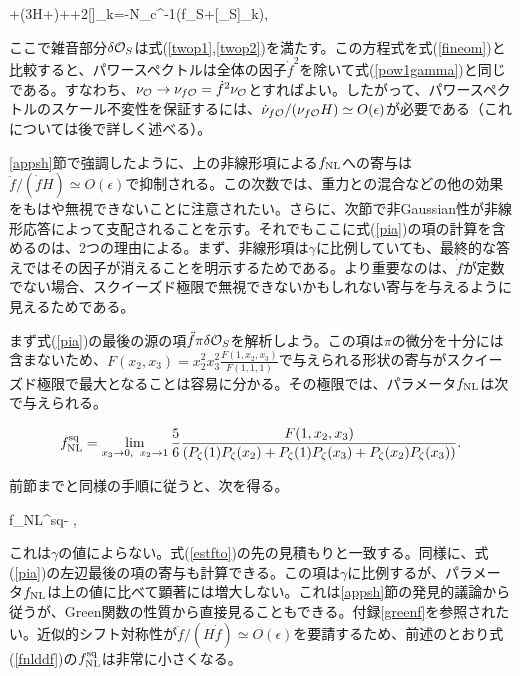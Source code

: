\be\label{pia}
\ddot{\pi}+(3H+\gamma)\dot{\pi}+\pi+2\gamma{}[\pi\dot{\pi}]_k=-N_c^{-1}\left(\dot f\delta \calo_S+[\pi\delta \calo_S]_k\right),
\ee

ここで雑音部分$\delta{\cal O}_S$は式(\ref{twop1},\ref{twop2})を満たす。この方程式を式(\ref{fineom})と比較すると、パワースペクトルは全体の因子$\dot f^2$を除いて式(\ref{pow1gamma})と同じである。すなわち、$\nu_{{\cal O}}\to\nu_{f{\cal O}}=\dot f^2\nu_{{\cal O}}$とすればよい。したがって、パワースペクトルのスケール不変性を保証するには、$\dot\nu_{f{\cal O}}/(\nu_{f{\cal O}}H)\simeq O(\epsilon)$が必要である（これについては後で詳しく述べる）。

\ref{appsh}節で強調したように、上の非線形項による$f_{\rm NL}$への寄与は$\ddot f/(\dot fH)\simeq O(\epsilon)$で抑制される。この次数では、重力との混合などの他の効果をもはや無視できないことに注意されたい。さらに、次節で非Gaussian性が非線形応答によって支配されることを示す。それでもここに式(\ref{pia})の項の計算を含めるのは、2つの理由による。まず、非線形項は$\gamma$に比例していても、最終的な答えではその因子が消えることを明示するためである。より重要なのは、$\dot f$が定数でない場合、スクイーズド極限で無視できないかもしれない寄与を与えるように見えるためである。

まず式(\ref{pia})の最後の源の項$\ddot f\pi\delta{\cal O}_S$を解析しよう。この項は$\pi$の微分を十分には含まないため、$F(x_2,x_3)=x_2^2x_3^2\frac{F(1,x_2,x_3)}{F(1,1,1)}$で与えられる形状の寄与がスクイーズド極限で最大となることは容易に分かる。その極限では、パラメータ$f_{\rm NL}$は次で与えられる。

\begin{equation}\label{squ}
f_{\rm NL}^{\rm sq} =\lim_{x_3\to 0,\,\ x_2\to 1}\frac{5}{6} \frac{F(1,x_2,x_3)}{(P_{\zeta}(1)P_{\zeta}(x_2)+P_{\zeta}(1)P_{\zeta}(x_3)+P_{\zeta}(x_2)P_{\zeta}(x_3))}.
\end{equation}

前節までと同様の手順に従うと、次を得る。

\beq f_{\rm NL}^{\rm sq}\simeq- \label{fnlddf},\eeq

これは$\gamma$の値によらない。式(\ref{estfto})の先の見積もりと一致する。同様に、式(\ref{pia})の左辺最後の項の寄与も計算できる。この項は$\gamma$に比例するが、パラメータ$f_{\rm NL}$は上の値に比べて顕著には増大しない。これは\ref{appsh}節の発見的議論から従うが、Green関数の性質から直接見ることもできる。付録\ref{greenf}を参照されたい。近似的シフト対称性が$\ddot f/(H\dot f)\simeq O(\epsilon)$を要請するため、前述のとおり式(\ref{fnlddf})の$f_{\rm NL}^{\rm sq}$は非常に小さくなる。

